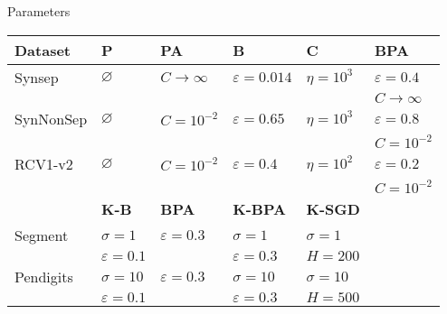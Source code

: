 \documentclass{beamer}
\begin{document}
\begin{frame}{Parameters}
\begin{small}
\begin{table}[h]
\begin{center}
\begin{tabular}{llllll}
				\hline
				{\bf Dataset}  & {\bf P} & {\bf PA } & {\bf B}& {\bf C} & {\bf BPA}\\
				\hline
				Synsep & $\varnothing$ & $C\rightarrow\infty$ & $\varepsilon = 0.014$ &$\eta = 10^3$ & $\varepsilon = 0.4$\\
				&&&&& $C \rightarrow \infty$\\
				
				SynNonSep & $\varnothing$ & $C=10^{-2}$ & $\varepsilon =0.65$ & $\eta = 10^3$& $\varepsilon = 0.8$\\
				&&&&& $C = 10^{-2}$\\			
				RCV1-v2 & $\varnothing$ & $C=10^{-2}$ & $\varepsilon =0.4$ & $\eta = 10^2$ & $\varepsilon = 0.2$\\
				&&&&& $C = 10^{-2}$\\
				\hline
				&{\bf K-B} & {\bf BPA} & {\bf K-BPA} &{\bf K-SGD}\\
				\hline
				Segment & $\sigma = 1$ & $\varepsilon = 0.3$ & $\sigma = 1$ &$\sigma = 1$\\
				&$\varepsilon =0.1$&&$\varepsilon = 0.3$ & $H = 200$\\
				Pendigits & $\sigma = 10$ & $\varepsilon = 0.3$ &$\sigma = 10$&$\sigma = 10$\\
				&$\varepsilon =0.1$&& $\varepsilon = 0.3$ & $H = 500$\\
				
				
			\end{tabular}	
		\end{center}
	\end{table}
	\end{small}
\end{frame}
\end{document}
